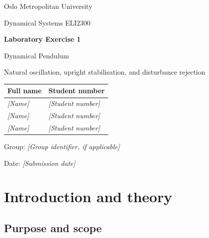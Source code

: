 \documentclass[11pt,a4paper]{article}
\newif\ifdraft
\DeclareRobustCommand{\guide}[1]{\ifdraft\par\smallskip\small\itshape Draft guidance: #1\par\smallskip\fi}
\newcommand{\manual}[1]{\cite[printed pp.~#1]{labmanual}}
\newcommand{\placeholder}[1]{\textit{[#1]}}
\begin{document}
\begin{titlepage}
\centering
{\Large Oslo Metropolitan University\par}
\vspace{12mm}
{\large Dynamical Systems ELI2300\par}
\vspace{18mm}
{\huge\bfseries Laboratory Exercise 1\par}
\vspace{5mm}
{\LARGE Dynamical Pendulum\par}
\vspace{12mm}
{\large Natural oscillation, upright stabilisation, and disturbance rejection\par}
\vfill
\begin{tabular}{ll}
\toprule
Full name & Student number \\
\midrule
\placeholder{Name} & \placeholder{Student number} \\
\placeholder{Name} & \placeholder{Student number} \\
\placeholder{Name} & \placeholder{Student number} \\
\bottomrule
\end{tabular}
\vspace{12mm}

Group: \placeholder{Group identifier, if applicable}\par
Date: \placeholder{Submission date}\par
\guide{Full names and student numbers are required by the submission instructions, printed p.~21. The subtitle, group field, and date field are template choices.}
\end{titlepage}

\tableofcontents
\newpage

\section{Introduction and theory}
\label{sec:introduction}
\guide{Required report section: \manual{21}. The subsection grouping and drafting prompts throughout this template are assistant suggestions. Consult RWM before finalising the format; its contents are not in the lab manual. No experimental results have been supplied.}

\subsection{Purpose and scope}
\guide{State the purpose in your own words: compare natural motion around the downward equilibrium (SP1), feedback-controlled motion around the upright equilibrium (SP2), and responses to disturbances. Explain the quantities used to assess stability, transient behaviour, and disturbance rejection. Source: Purpose and Objectives, \manual{1--2}.}
\end{document}
